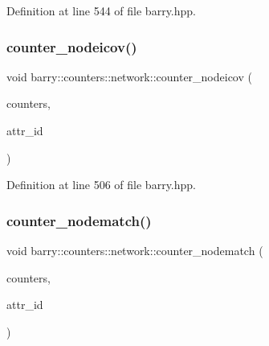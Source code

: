 Definition at line 544 of file barry.\+hpp.

\mbox{\label{namespacebarry_1_1counters_1_1network_a42073ab360a9f796126662927acc5470}} 
\subsubsection{\texorpdfstring{counter\+\_\+nodeicov()}{counter\_nodeicov()}}
{\footnotesize\ttfamily void barry\+::counters\+::network\+::counter\+\_\+nodeicov (\begin{DoxyParamCaption}\item[{\hyperlink{namespacebarry_1_1counters_1_1network_aa72fdb34752ac24167a06ee196a8fff6}{Net\+Counters} $\ast$}]{counters,  }\item[{\hyperlink{namespacebarry_a11dfc53ddb4672278319aa04f1e09a6c}{uint}}]{attr\+\_\+id }\end{DoxyParamCaption})\hspace{0.3cm}{\ttfamily [inline]}}



Definition at line 506 of file barry.\+hpp.

\mbox{\label{namespacebarry_1_1counters_1_1network_a2333b5893d1ba684925be6855bc33868}} 
\subsubsection{\texorpdfstring{counter\+\_\+nodematch()}{counter\_nodematch()}}
{\footnotesize\ttfamily void barry\+::counters\+::network\+::counter\+\_\+nodematch (\begin{DoxyParamCaption}\item[{\hyperlink{namespacebarry_1_1counters_1_1network_aa72fdb34752ac24167a06ee196a8fff6}{Net\+Counters} $\ast$}]{counters,  }\item[{\hyperlink{namespacebarry_a11dfc53ddb4672278319aa04f1e09a6c}{uint}}]{attr\+\_\+id }\end{DoxyParamCaption})\hspace{0.3cm}{\ttfamily [inline]}}




